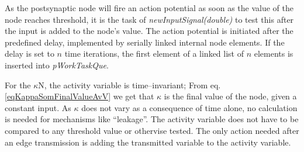 		As the postsynaptic node will fire an action potential as soon as the value of the node reaches threshold, 
			it is the task of \emph{newInputSignal(double)} to test this after the input is added to the node's value.
		The action potential is initiated after the predefined delay, implemented by serially linked internal node elements.
		If the delay is set to $n$ time iterations, the first element of a linked list of $n$ elements is inserted into \emph{pWorkTaskQue}.

		For the $\kappa$N, the activity variable is time--invariant; From eq. \eqref{eqKappaSomFinalValueAvV} we get that $\kappa$ is the final value of the node, given a constant input.
		As $\kappa$ does not vary as a consequence of time alone, no calculation is needed for mechanisms like ``leakage''.
		The activity variable does not have to be compared to any threshold value or othervise tested.
		The only action needed after an edge transmission is adding the transmitted variable to the activity variable.

